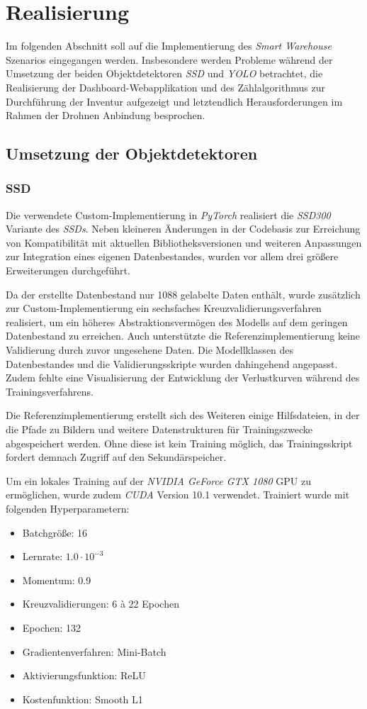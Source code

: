 \chapter{Realisierung}

Im folgenden Abschnitt soll auf die Implementierung des \textit{Smart Warehouse} Szenarios eingegangen werden. Insbesondere werden Probleme während der Umsetzung der beiden Objektdetektoren \textit{SSD} und \textit{YOLO} betrachtet, die Realisierung der Dashboard-Webapplikation und des Zählalgorithmus zur Durchführung der Inventur aufgezeigt und letztendlich Herausforderungen im Rahmen der Drohnen Anbindung besprochen.

\section{Umsetzung der Objektdetektoren}

\subsection*{SSD}

Die verwendete Custom-Implementierung in \textit{PyTorch} realisiert die \textit{SSD300} Variante des \textit{SSDs}. Neben kleineren Änderungen in der Codebasis zur Erreichung von Kompatibilität mit aktuellen Bibliotheksversionen und weiteren Anpassungen zur Integration eines eigenen Datenbestandes, wurden vor allem drei größere Erweiterungen durchgeführt. 

Da der erstellte Datenbestand nur 1088 gelabelte Daten enthält, wurde zusätzlich zur Custom-Implementierung ein sechsfaches Kreuzvalidierungsverfahren realisiert, um ein höheres Abstraktionsvermögen des Modells auf dem geringen Datenbestand zu erreichen. Auch unterstützte die Referenzimplementierung keine Validierung durch zuvor ungesehene Daten. Die Modellklassen des Datenbestandes und die Validierungsskripte wurden dahingehend angepasst. Zudem fehlte eine Visualisierung der Entwicklung der Verlustkurven während des Trainingsverfahrens.

Die Referenzimplementierung erstellt sich des Weiteren einige Hilfsdateien, in der die Pfade zu Bildern und weitere Datenstrukturen für Trainingszwecke abgespeichert werden. Ohne diese ist kein Training möglich, das Trainingsskript fordert demnach Zugriff auf den Sekundärspeicher. 

Um ein lokales Training auf der \textit{NVIDIA GeForce GTX 1080} GPU zu ermöglichen, wurde zudem \textit{CUDA} Version 10.1 verwendet. Trainiert wurde mit folgenden Hyperparametern:
\begin{itemize}
	\item Batchgröße: 16
	\item Lernrate: $1.0\cdot 10^{-3}$
	\item Momentum: 0.9
	\item Kreuzvalidierungen: 6 à 22 Epochen
	\item Epochen: 132
	\item Gradientenverfahren: Mini-Batch
	\item Aktivierungsfunktion: ReLU
	\item Kostenfunktion: Smooth L1
\end{itemize}


